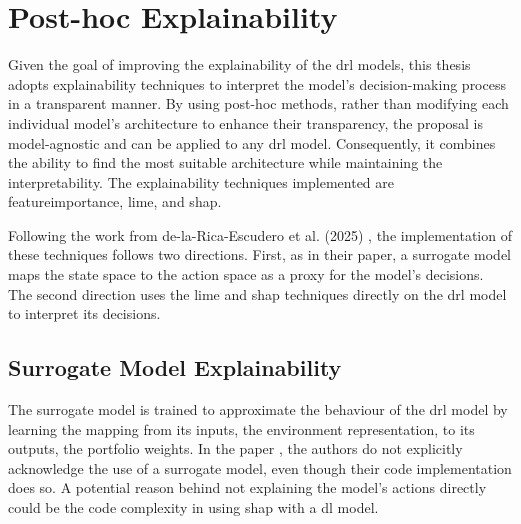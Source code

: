 \section{Post-hoc Explainability} \label{sec:post_hoc_explainability}

Given the goal of improving the explainability of the \acrshort{drl} models, this thesis adopts explainability techniques to interpret the model's decision-making process in a transparent manner. By using post-hoc methods, rather than modifying each individual model's architecture to enhance their transparency, the proposal is model-agnostic and can be applied to any \acrshort{drl} model. Consequently, it combines the ability to find the most suitable architecture while maintaining the interpretability. The explainability techniques implemented are \Gls{featureimportance}, \acrfull{lime}, and \acrfull{shap}.

Following the work from de-la-Rica-Escudero et al. (2025) \cite{de-La-Rica-Escudero2025}, the implementation of these techniques follows two directions. First, as in their paper, a surrogate model maps the state space to the action space as a proxy for the model's decisions. The second direction uses the \acrshort{lime} and \acrshort{shap} techniques directly on the \acrshort{drl} model to interpret its decisions.

\subsection{Surrogate Model Explainability} \label{subsec:surrogate_model_explainability}

The surrogate model is trained to approximate the behaviour of the \acrshort{drl} model by learning the mapping from its inputs, the environment representation, to its outputs, the portfolio weights. In the paper \cite{de-La-Rica-Escudero2025}, the authors do not explicitly acknowledge the use of a surrogate model, even though their code implementation does so. A potential reason behind not explaining the model's actions directly could be the code complexity in using \acrshort{shap} with a \acrshort{dl} model. 

